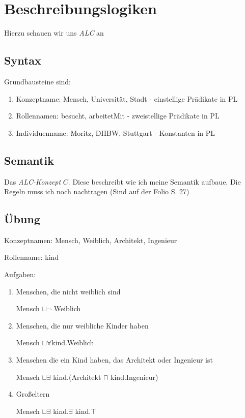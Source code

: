 \documentclass[a4paper]{article}
\begin{document}
\section{Beschreibungslogiken}

Hierzu schauen wir uns \textit{ALC} an

\subsection{Syntax}

Grundbausteine sind:

\begin{enumerate}
    \item Konzeptname: Mensch, Universität, Stadt - einstellige Prädikate in PL
    \item Rollennamen: besucht, arbeitetMit - zweistellige Prädikate in PL
    \item Individuenname: Moritz, DHBW, Stuttgart - Konstanten in PL
\end{enumerate}


\subsection{Semantik}


Das \textit{ALC-Konzept} $C$. Diese beschreibt wie ich meine Semantik aufbaue. Die Regeln muss ich noch nachtragen (Sind auf der Folio S. 27)

\subsection{Übung}

Konzeptnamen: Mensch, Weiblich, Architekt, Ingenieur

Rollenname: kind

Aufgaben:

\begin{enumerate}
    \item Menschen, die nicht weiblich sind
    
    Mensch $\sqcup \neg$ Weiblich
    \item Menschen, die nur weibliche Kinder haben
    
    Mensch $\sqcup \forall$kind.Weiblich
    \item Menschen die ein Kind haben, das Architekt oder Ingenieur ist
    
    Mensch $\sqcup \exists$ kind.(Architekt $\sqcap$ kind.Ingenieur)
    \item Großeltern
    
    Mensch $\sqcup \exists$ kind.$\exists$ kind.$\top$
\end{enumerate}
\end{document}
